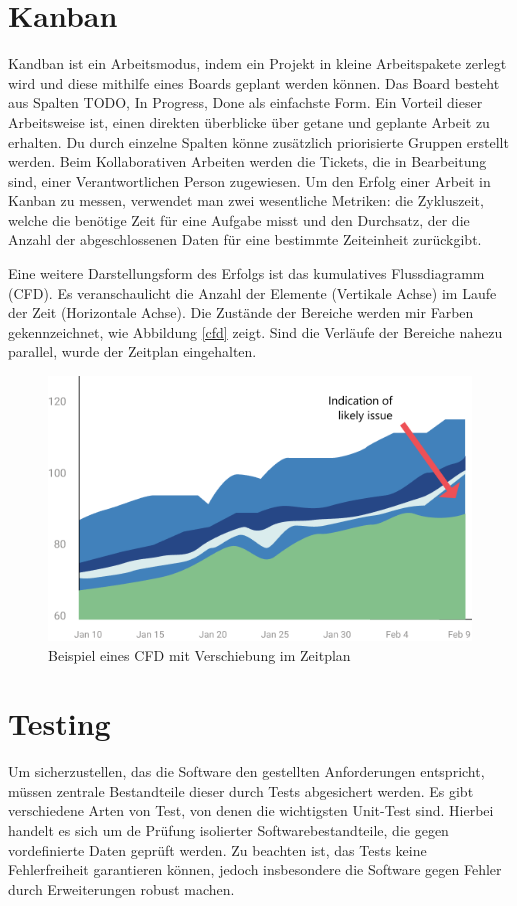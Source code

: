 \section{Kanban}
Kandban ist ein Arbeitsmodus, indem ein Projekt in kleine Arbeitspakete zerlegt wird und diese mithilfe eines Boards geplant werden können.
Das Board besteht aus Spalten TODO, In Progress, Done als einfachste Form.
Ein Vorteil dieser Arbeitsweise ist, einen direkten überblicke über getane und geplante Arbeit zu erhalten.
Du durch einzelne Spalten könne zusätzlich priorisierte Gruppen erstellt werden.
Beim Kollaborativen Arbeiten werden die Tickets, die in Bearbeitung sind, einer Verantwortlichen Person zugewiesen.
Um den Erfolg einer Arbeit in Kanban zu messen, verwendet man zwei wesentliche Metriken: die Zykluszeit, welche die benötige Zeit für eine Aufgabe misst und den Durchsatz, der die Anzahl der abgeschlossenen Daten für eine bestimmte Zeiteinheit zurückgibt. \cite{kanban}

Eine weitere Darstellungsform des Erfolgs ist das kumulatives Flussdiagramm (CFD). Es veranschaulicht die Anzahl der Elemente (Vertikale Achse) im Laufe der Zeit (Horizontale Achse). Die Zustände der Bereiche werden mir Farben gekennzeichnet, wie Abbildung \vref{cfd} zeigt. Sind die Verläufe der Bereiche nahezu parallel, wurde der Zeitplan eingehalten.

\begin{figure}[ht]
	\centering
	\includegraphics[width=0.7\linewidth]{kanban-cumulative-flow-2.png}
	\caption{Beispiel eines CFD mit Verschiebung im Zeitplan}
	\label{cfd}
\end{figure}

\section{Testing}
Um sicherzustellen, das die Software den gestellten Anforderungen entspricht, müssen zentrale Bestandteile dieser durch Tests abgesichert werden.
Es gibt verschiedene Arten von Test, von denen die wichtigsten Unit-Test sind.
Hierbei handelt es sich um de Prüfung isolierter Softwarebestandteile, die gegen vordefinierte Daten geprüft werden.
Zu beachten ist, das Tests keine Fehlerfreiheit garantieren können, jedoch insbesondere die Software gegen Fehler durch Erweiterungen robust machen.\cite{ms-testing}

